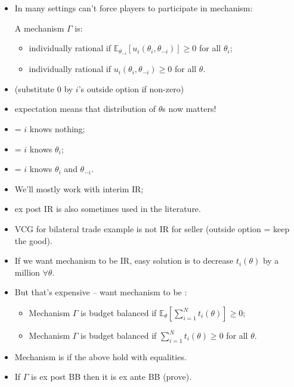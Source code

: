 \documentclass[english,handout]{beamer}		%
\def\lyxframeend{} %
\begin{document}
\begin{itemize}
	\item In many settings can't force players to participate in mechanism:
	\begin{definition}[IR]
		A mechanism $\Gamma$ is:
		\begin{itemize}
			\item {} \alert{individually rational} if
			$\mathbb{E}_{\theta_{-i}} \left[u_i(\theta_i,\theta_{-i})\right] \geq 0$ for all $\theta_i$;
			\item {} \alert{individually rational} if
			$u_i(\theta_i,\theta_{-i}) \geq 0$ for all $\theta$.
		\end{itemize}
		
		 
	\end{definition}
	\item (substitute $0$ by $i$'s outside option if non-zero)
	\item expectation means that distribution of $\theta$s now matters!
\end{itemize}
\lyxframeend


\begin{itemize}
	\item {} = $i$ knows nothing;
	\item {} = $i$ knows $\theta_i$;
	\item {} = $i$ knows $\theta_i$ and $\theta_{-i}$.
	\item We'll mostly work with interim IR; 
	\item ex post IR is also sometimes used in the literature.
\end{itemize}
\lyxframeend


\begin{itemize}
	\item VCG for bilateral trade example is not IR for seller (outside option = keep the good).
	\pause\medskip
	\item If we want mechanism to be IR, easy solution is to decrease $t_i(\theta)$ by a million $\forall \theta$.
	\item But that's expensive -- want mechanism to be :
	\pause
	\begin{definition}[BB]
		\begin{itemize}
			\item Mechanism $\Gamma$ is  \alert{budget balanced} if $\mathbb{E}_\theta \left[ \sum_{i=1}^N t_i (\theta) \right] \geq 0$;
			\item Mechanism $\Gamma$ is  \alert{budget balanced} if $\sum_{i=1}^N t_i (\theta) \geq 0$ for all $\theta$.
		\end{itemize}
	\end{definition}
	\item Mechanism is  if the above hold with equalities.
	\item If $\Gamma$ is ex post BB then it is ex ante BB (prove).
\end{itemize}
\lyxframeend
\end{document}
